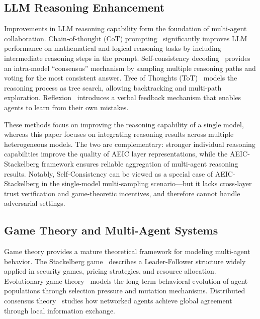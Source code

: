 \documentclass[12pt,a4paper]{article}
\begin{document}
\subsection{LLM Reasoning Enhancement}

Improvements in LLM reasoning capability form the foundation of multi-agent collaboration. Chain-of-thought (CoT) prompting~\cite{wei2022chain} significantly improves LLM performance on mathematical and logical reasoning tasks by including intermediate reasoning steps in the prompt. Self-consistency decoding~\cite{wang2023selfconsistency} provides an intra-model ``consensus'' mechanism by sampling multiple reasoning paths and voting for the most consistent answer. Tree of Thoughts (ToT)~\cite{yao2023tree} models the reasoning process as tree search, allowing backtracking and multi-path exploration. Reflexion~\cite{shinn2023reflexion} introduces a verbal feedback mechanism that enables agents to learn from their own mistakes.

These methods focus on improving the reasoning capability of a single model, whereas this paper focuses on integrating reasoning results across multiple heterogeneous models. The two are complementary: stronger individual reasoning capabilities improve the quality of AEIC layer representations, while the AEIC-Stackelberg framework ensures reliable aggregation of multi-agent reasoning results. Notably, Self-Consistency can be viewed as a special case of AEIC-Stackelberg in the single-model multi-sampling scenario---but it lacks cross-layer trust verification and game-theoretic incentives, and therefore cannot handle adversarial settings.

\subsection{Game Theory and Multi-Agent Systems}

Game theory provides a mature theoretical framework for modeling multi-agent behavior. The Stackelberg game~\cite{stackelberg2011market} describes a Leader-Follower structure widely applied in security games, pricing strategies, and resource allocation. Evolutionary game theory~\cite{han2022emergent} models the long-term behavioral evolution of agent populations through selection pressure and mutation mechanisms. Distributed consensus theory~\cite{olfati2007consensus} studies how networked agents achieve global agreement through local information exchange.
\end{document}
